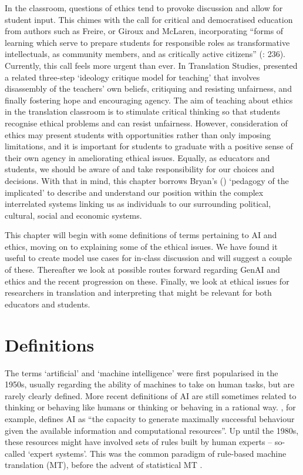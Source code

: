 \documentclass[output=paper]{langscibook}
\begin{document}
In the classroom, questions of ethics tend to provoke discussion and allow for student input. This chimes with the call for critical and democratised education from authors such as Freire, or Giroux and McLaren, incorporating “forms of learning which serve to prepare students for responsible roles as transformative intellectuals, as community members, and as critically active citizens” (\citealt{giroux1997}: 236). Currently, this call feels more urgent than ever. In Translation Studies, \citet{abdallah_towards_2011} presented a related three-step ‘ideology critique model for teaching’ that involves disassembly of the teachers’ own beliefs, critiquing and resisting unfairness, and finally fostering hope and encouraging agency. The aim of teaching about ethics in the translation classroom is to stimulate critical thinking so that students recognise ethical problems and can resist unfairness. However, consideration of ethics may present students with opportunities rather than only imposing limitations, and it is important for students to graduate with a positive sense of their own agency in ameliorating ethical issues. Equally, as educators and students, we should be aware of and take responsibility for our choices and decisions. With that in mind, this chapter borrows Bryan's (\citeyear{bryan_pedagogy_2022}) ‘pedagogy of the implicated’ to describe and understand our position within the complex interrelated systems linking us as individuals to our surrounding political, cultural, social and economic systems.

This chapter will begin with some definitions of terms pertaining to AI and ethics, moving on to explaining some of the ethical issues. We have found it useful to create model use cases for in-class discussion and will suggest a couple of these. Thereafter we look at possible routes forward regarding GenAI and ethics and the recent progression on these. Finally, we look at ethical issues for researchers in translation and interpreting that might be relevant for both educators and students.

\section{Definitions}\label{sec:6:2}
The terms `artificial' and `machine intelligence' were first popularised in the 1950s, usually regarding the ability of machines to take on human tasks, but are rarely clearly defined. More recent definitions of AI are still sometimes related to thinking or behaving like humans or thinking or behaving in a rational way. \citet[12]{Russell1999}, for example, defines AI as “the capacity to generate maximally successful behaviour given the available information and computational resources”. Up until the 1980s, these resources might have involved sets of rules built by human experts – so-called ‘expert systems’. This was the common paradigm of rule-based machine translation (MT), before the advent of statistical MT \citep{brownetal1988statistical}.
\end{document}
